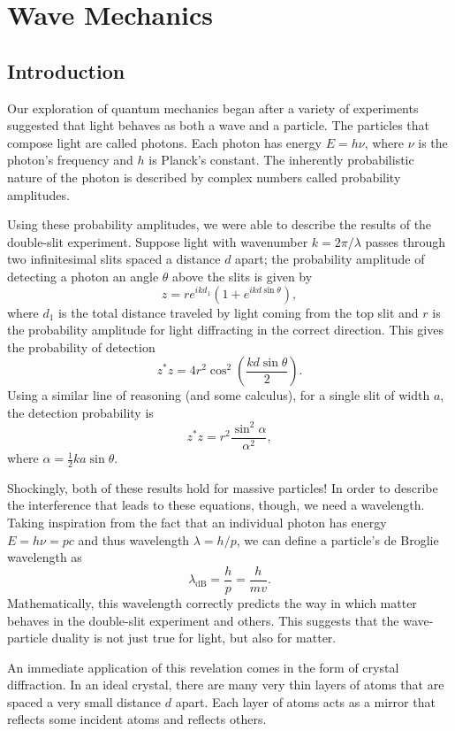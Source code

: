 \documentclass[../p052main.tex]{subfiles}
\begin{document}
\chapter{Wave Mechanics}
\section{Introduction}
Our exploration of quantum mechanics began after a variety of experiments suggested that light behaves as both a wave and a particle.
The particles that compose light are called photons.
Each photon has energy $E = h\nu$, where $\nu$ is the photon's frequency and $h$ is Planck's constant.
The inherently probabilistic nature of the photon is described by complex numbers called probability amplitudes.

Using these probability amplitudes, we were able to describe the results of the double-slit experiment.
Suppose light with wavenumber $k = 2\pi / \lambda$ passes through two infinitesimal slits spaced a distance $d$ apart; the probability amplitude of detecting a photon an angle $\theta$ above the slits is given by
\[ z = re^{ikd_1} \left( 1 + e^{ikd \sin \theta} \right), \]
where $d_1$ is the total distance traveled by light coming from the top slit and $r$ is the probability amplitude for light diffracting in the correct direction.
This gives the probability of detection
\[ z^*z = 4r^2 \cos^2 \left( \frac{kd \sin \theta}{2} \right). \]
Using a similar line of reasoning (and some calculus), for a single slit of width $a$, the detection probability is
\[ z^*z = r^2 \frac{\sin^2 \alpha}{\alpha^2}, \]
where $\alpha = \frac{1}{2}ka\sin\theta$.

Shockingly, both of these results hold for massive particles!
In order to describe the interference that leads to these equations, though, we need a wavelength.
Taking inspiration from the fact that an individual photon has energy $E = h\nu = pc$ and thus wavelength $\lambda = h/p$, we can define a particle's de Broglie wavelength as
\[ \lambda_\text{dB} = \frac{h}{p} = \frac{h}{mv}. \]
Mathematically, this wavelength correctly predicts the way in which matter behaves in the double-slit experiment and others.
This suggests that the wave-particle duality is not just true for light, but also for matter.

An immediate application of this revelation comes in the form of crystal diffraction.
In an ideal crystal, there are many very thin layers of atoms that are spaced a very small distance $d$ apart.
Each layer of atoms acts as a mirror that reflects some incident atoms and reflects others.
\end{document}
